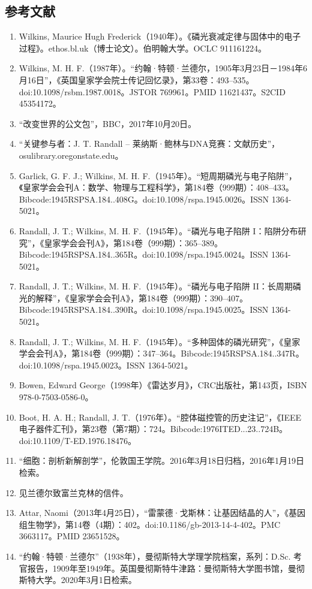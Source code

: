 \subsection{参考文献}
\begin{enumerate}
\item Wilkins, Maurice Hugh Frederick（1940年）。《磷光衰减定律与固体中的电子过程》。ethos.bl.uk（博士论文）。伯明翰大学。OCLC 911161224。
\item Wilkins, M. H. F.（1987年）。“约翰·特顿·兰德尔，1905年3月23日－1984年6月16日”，《英国皇家学会院士传记回忆录》，第33卷：493–535。doi:10.1098/rsbm.1987.0018。JSTOR 769961。PMID 11621437。S2CID 45354172。
\item “改变世界的公文包”，BBC，2017年10月20日。
\item “关键参与者：J. T. Randall – 莱纳斯·鲍林与DNA竞赛：文献历史”，osulibrary.oregonstate.edu。
\item Garlick, G. F. J.; Wilkins, M. H. F.（1945年）。“短周期磷光与电子陷阱”，《皇家学会会刊A：数学、物理与工程科学》，第184卷（999期）：408–433。Bibcode:1945RSPSA.184..408G。doi:10.1098/rspa.1945.0026。ISSN 1364-5021。
\item Randall, J. T.; Wilkins, M. H. F.（1945年）。“磷光与电子陷阱 I：陷阱分布研究”，《皇家学会会刊A》，第184卷（999期）：365–389。Bibcode:1945RSPSA.184..365R。doi:10.1098/rspa.1945.0024。ISSN 1364-5021。
\item Randall, J. T.; Wilkins, M. H. F.（1945年）。“磷光与电子陷阱 II：长周期磷光的解释”，《皇家学会会刊A》，第184卷（999期）：390–407。Bibcode:1945RSPSA.184..390R。doi:10.1098/rspa.1945.0025。ISSN 1364-5021。
\item Randall, J. T.; Wilkins, M. H. F.（1945年）。“多种固体的磷光研究”，《皇家学会会刊A》，第184卷（999期）：347–364。Bibcode:1945RSPSA.184..347R。doi:10.1098/rspa.1945.0023。ISSN 1364-5021。
\item Bowen, Edward George（1998年）《雷达岁月》，CRC出版社，第143页，ISBN 978-0-7503-0586-0。
\item Boot, H. A. H.; Randall, J. T.（1976年）。“腔体磁控管的历史注记”，《IEEE电子器件汇刊》，第23卷（第7期）：724。Bibcode:1976ITED...23..724B。doi:10.1109/T-ED.1976.18476。
\item “细胞：剖析新解剖学”，伦敦国王学院。2016年3月18日归档，2016年1月19日检索。
\item 见兰德尔致富兰克林的信件。
\item Attar, Naomi（2013年4月25日），“雷蒙德·戈斯林：让基因结晶的人”，《基因组生物学》，第14卷（4期）：402。doi:10.1186/gb-2013-14-4-402。PMC 3663117。PMID 23651528。
\item “约翰·特顿·兰德尔”（1938年），曼彻斯特大学理学院档案，系列：D.Sc. 考官报告，1909年至1949年。英国曼彻斯特牛津路：曼彻斯特大学图书馆，曼彻斯特大学。2020年3月1日检索。
\end{enumerate}
